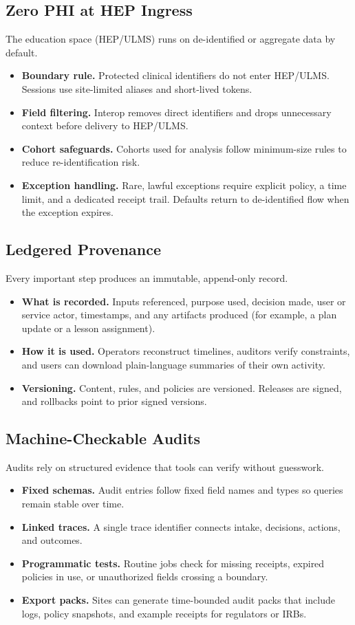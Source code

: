 \documentclass[12pt]{article}
\begin{document}
\subsection*{Zero PHI at HEP Ingress}
The education space (HEP/ULMS) runs on de-identified or aggregate data by default.
\begin{itemize}[leftmargin=*]
  \item \textbf{Boundary rule.} Protected clinical identifiers do not enter HEP/ULMS. Sessions use site-limited aliases and short-lived tokens.
  \item \textbf{Field filtering.} Interop removes direct identifiers and drops unnecessary context before delivery to HEP/ULMS.
  \item \textbf{Cohort safeguards.} Cohorts used for analysis follow minimum-size rules to reduce re-identification risk.
  \item \textbf{Exception handling.} Rare, lawful exceptions require explicit policy, a time limit, and a dedicated receipt trail. Defaults return to de-identified flow when the exception expires.
\end{itemize}

\subsection*{Ledgered Provenance}
Every important step produces an immutable, append-only record.
\begin{itemize}[leftmargin=*]
  \item \textbf{What is recorded.} Inputs referenced, purpose used, decision made, user or service actor, timestamps, and any artifacts produced (for example, a plan update or a lesson assignment).
  \item \textbf{How it is used.} Operators reconstruct timelines, auditors verify constraints, and users can download plain-language summaries of their own activity.
  \item \textbf{Versioning.} Content, rules, and policies are versioned. Releases are signed, and rollbacks point to prior signed versions.
\end{itemize}

\subsection*{Machine-Checkable Audits}
Audits rely on structured evidence that tools can verify without guesswork.
\begin{itemize}[leftmargin=*]
  \item \textbf{Fixed schemas.} Audit entries follow fixed field names and types so queries remain stable over time.
  \item \textbf{Linked traces.} A single trace identifier connects intake, decisions, actions, and outcomes.
  \item \textbf{Programmatic tests.} Routine jobs check for missing receipts, expired policies in use, or unauthorized fields crossing a boundary.
  \item \textbf{Export packs.} Sites can generate time-bounded audit packs that include logs, policy snapshots, and example receipts for regulators or IRBs.
\end{itemize}
\end{document}
